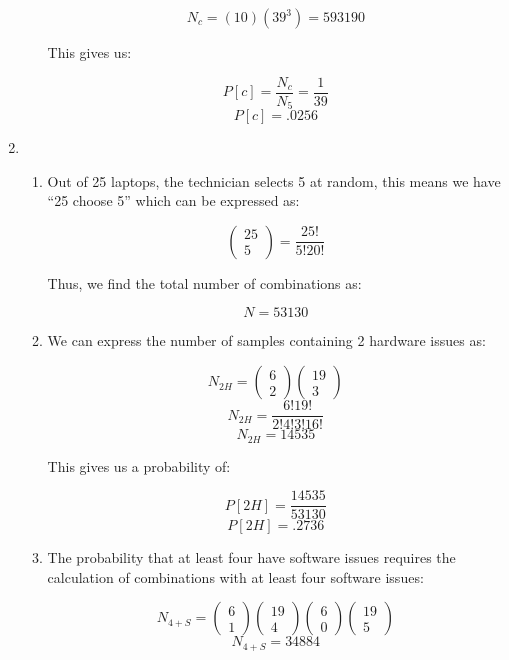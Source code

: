 \begin{enumerate}
\begin{enumerate}
        $$N_c=(10)(39^3)=593190$$

        This gives us:

        $$P[c]=\frac{N_c}{N_5}=\frac{1}{39}$$
        $$\boxed{P[c]=.0256}$$

    \end{enumerate}

  \item

    \begin{enumerate}

      \item Out of 25 laptops, the technician selects 5 at random, this means we have ``25 choose 5'' which can be expressed as:

        $$\left( \begin{matrix} 25\\ 5\end{matrix} \right)=\frac{25!}{5!20!}$$

        Thus, we find the total number of combinations as:

        $$\boxed{N=53130}$$

      \item We can express the number of samples containing 2 hardware issues as:

        $$N_{2H}=\left( \begin{matrix} 6\\ 2\end{matrix} \right)\left( \begin{matrix} 19\\ 3\end{matrix} \right)$$
        $$N_{2H}=\frac{6!19!}{2!4!3!16!}$$
        $$N_{2H}=14535$$

        This gives us a probability of:

        $$P[2H]=\frac{14535}{53130}$$
        $$\boxed{P[2H]=.2736}$$

      \item The probability that at least four have software issues requires the calculation of combinations with at least four software issues:

        $$N_{4+S}=\left( \begin{matrix} 6\\ 1\end{matrix} \right)\left( \begin{matrix} 19\\ 4\end{matrix} \right)\left( \begin{matrix} 6\\ 0\end{matrix} \right)\left( \begin{matrix} 19\\ 5\end{matrix} \right)$$
        $$N_{4+S}=34884$$


\end{enumerate}
\end{enumerate}

